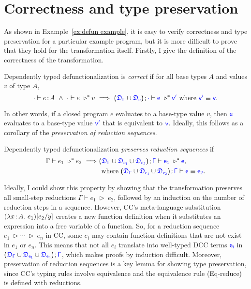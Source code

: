 
\section{Correctness and type preservation}
\label{sec:5.1}
As shown in Example~\ref{ex:defun example}, it is easy to verify correctness and type preservation for a particular example program, but it is more difficult to prove that they hold for the transformation itself.
Firstly, I give the definition of the correctness of the transformation.

\begin{definition}
Dependently typed defunctionalization is \textit{correct} if for all base types $A$ and values $v$ of type $A$,
\begin{equation*}
	\cdot \vdash e \goodcolon A \ \land \
	\cdot \vdash e\ \triangleright^* v\ \Longrightarrow\ 
	\sfpl \target{\fdef_{\Gamma}} \cup \target{\fdef_{e}} \sfpr \semicolon \target{\cdot} \vdash \target{e}\ \triangleright^* \target{v'} \text{ where } \target{v'} \equiv \target{v}.
\end{equation*}
\end{definition}
In other words, if a closed program $e$ evaluates to a base-type value $v$, then $\target{e}$ evaluates to a base-type value $\target{v'}$ that is equivalent to $\target{v}$. Ideally, this follows as a corollary of the \textit{preservation of reduction sequences}.
\begin{definition}
Dependently typed defunctionalization \textit{preserves reduction sequences} if
\begin{align*}
	\Gamma \vdash e_1\ \triangleright^* e_2\ \Longrightarrow\ 
	&\sfpl \target{\fdef_{\Gamma}} \cup \target{\fdef_{e_1}} \cup \target{\fdef_{e_2}} \sfpr \semicolon \target{\Gamma} \vdash
	\target{e_1}\ \triangleright^* \target{e},\\ 
	&\text{ where } \sfpl \target{\fdef_{\Gamma}} \cup \target{\fdef_{e_1}} \cup \target{\fdef_{e_2}} \sfpr \semicolon \target{\Gamma} \vdash \target{e} \equiv \target{e_2}.
\end{align*}
\end{definition}

Ideally, I could show this property by showing that the transformation preserves all small-step reductions $\Gamma \vdash e_1\ \triangleright\ e_2$, followed by an induction on the number of reduction steps in a sequence. However, CC's meta-language substitution $(\lambda x\hspace{0.5mm}{:}\hspace{0.5mm} A.\ e_1)[e_2\slash y]$ creates a new function definition when it substitutes an expression into a free variable of a function.
So, for a reduction sequence $e_1\ \triangleright \cdots \ \triangleright\ e_n$ in CC, some $e_i$ may contain function definitions that are not exist in $e_1$ or $e_n$. This means that not all $e_i$ translate into well-typed DCC terms $\target{e_i}$ in $\sfpl \target{\fdef_{\Gamma}} \cup \target{\fdef_{e_1}} \cup \target{\fdef_{e_n}} \sfpr \semicolon \target{\Gamma}$, which makes proofs by induction difficult. Moreover, preservation of reduction sequences is a key lemma for showing type preservation, since CC's typing rules involve equivalence and the equivalence rule (Eq-reduce) is defined with reductions.

